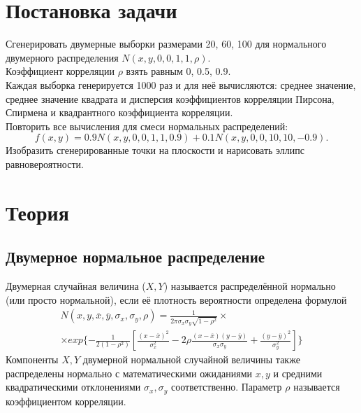 
\usepackage{amsmath}




\renewcommand\contentsname{\centerline{Содержание}}
\tableofcontents
\newpage

\listoffigures
\newpage

\listoftables
\newpage

\section{Постановка задачи}
Сгенерировать двумерные выборки размерами 20, 60, 100 для нормального двумерного распределения $N(x, y, 0, 0, 1, 1, \rho)$.\\
Коэффициент корреляции $\rho$ взять равным 0, 0.5, 0.9.\\
Каждая выборка генерируется 1000 раз и для неё вычисляются: среднее значение, среднее значение квадрата и дисперсия коэффициентов корреляции Пирсона, Спирмена и квадрантного коэффициента корреляции.\\
Повторить все вычисления для смеси нормальных распределений:
\begin{equation} \label{func}
f(x, y) = 0.9N(x, y, 0, 0, 1, 1, 0.9) + 0.1N(x, y, 0, 0, 10, 10,−0.9).
\end{equation}
Изобразить сгенерированные точки на плоскости и нарисовать эллипс равновероятности.

\section{Теория}
\subsection{Двумерное нормальное распределение}
Двумерная случайная величина ($X, Y$) называется распределённой нормально (или просто нормальной), если её плотность вероятности определена формулой
\begin{gather}
N(x, y, \overline{x}, \overline{y}, \sigma_x, \sigma_y, \rho)=\frac{1}{2\pi \sigma_x\sigma_y\sqrt{1-\rho^2}}\times \\
\times exp \{-\frac{1}{2(1-\rho^2)}[\frac{(x-\overline{x})^2}{\sigma_x^2}-2\rho\frac{(x-\overline{x})(y-\overline{y})}{\sigma_x \sigma_y}+\frac{(y-\overline{y})^2}{\sigma_y^2}]\}
\end{gather}
Компоненты $X, Y$ двумерной нормальной случайной величины также распределены нормально с математическими ожиданиями $x, y$ и средними квадратическими отклонениями $\sigma_x, \sigma_y$ соответственно.
Параметр $\rho$ называется коэффициентом корреляции.


